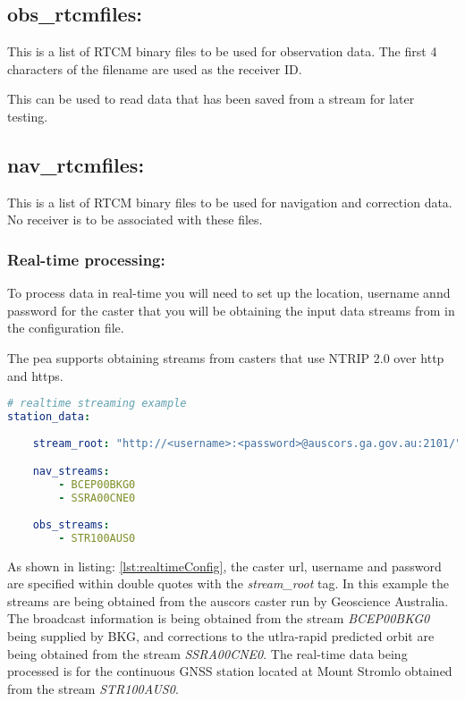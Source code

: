 \subsection*{obs\_rtcmfiles:}
This is a list of RTCM binary files to be used for observation data. The first 4 characters of the filename are used as the receiver ID.

This can be used to read data that has been saved from a stream for later testing.

\subsection*{nav\_rtcmfiles:}
This is a list of RTCM binary files to be used for navigation and correction data. No receiver is to be associated with these files.

\subsubsection{Real-time processing:}

To process data in real-time you will need to set up the location, username annd password for the caster that you will be obtaining the input data streams from in the configuration file.

The pea supports obtaining streams from casters that use NTRIP 2.0 over http and https.


\begin{lstlisting}[language=yaml,caption=station\_data:, label={lst:realtimeConfig}]
# realtime streaming example
station_data:
	
	stream_root: "http://<username>:<password>@auscors.ga.gov.au:2101/"

	nav_streams:
		- BCEP00BKG0
		- SSRA00CNE0
		
	obs_streams:
		- STR100AUS0
\end{lstlisting}

As shown in listing: \ref{lst:realtimeConfig}, the caster url, username and password are specified within double quotes with the \emph{stream\_root} tag. In this example the streams are being obtained from the auscors caster run by Geoscience Australia. 
The broadcast information is being obtained from the stream \emph{BCEP00BKG0} being supplied by BKG, and corrections to the utlra-rapid predicted orbit are being obtained from the stream \emph{SSRA00CNE0}. 
The real-time data being processed is for the continuous GNSS station located at Mount Stromlo obtained from the stream \emph{STR100AUS0}.

